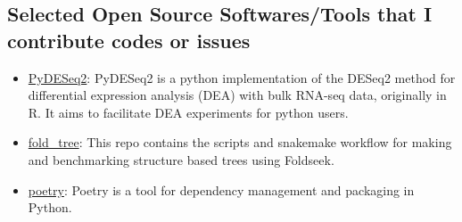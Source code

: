 \subsection*{\textbf{Selected Open Source Softwares/Tools that I contribute codes or issues}}
\begin{itemize}
    \item \href{https://github.com/owkin/PyDESeq2}{PyDESeq2}: PyDESeq2 is a python implementation of the DESeq2 method for differential 
    expression analysis (DEA) with bulk RNA-seq data, originally in R. It aims to facilitate DEA experiments for python users.
    \item \href{https://github.com/DessimozLab/fold_tree}{fold\_tree}: This repo contains the scripts and snakemake workflow for making and benchmarking structure based trees using Foldseek.
    \item \href{https://github.com/python-poetry/poetry}{poetry}: Poetry is a tool for dependency management and packaging in Python.
\end{itemize}
